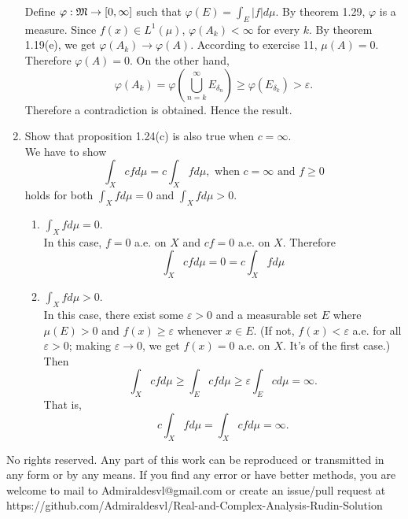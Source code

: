 \documentclass{article}
\begin{document}
\begin{enumerate}
 	Define $\varphi:\mathfrak{M}\to[0,\infty]$ such that $\varphi(E)=\int_{E}|f|d\mu$. By theorem 1.29, $\varphi$ is a measure. Since $f(x)\in{L^1(\mu)}$, $\varphi(A_k)<\infty$ for every $k$. By theorem 1.19(e), we get $\varphi(A_k)\to\varphi(A)$. According to exercise 11, $\mu(A)=0$. Therefore $\varphi(A)=0$. On the other hand,
 	\[
 		\varphi(A_k)=\varphi(\bigcup_{n=k}^{\infty}E_{\delta_n})\geq\varphi(E_{\delta_k})>\varepsilon.
 	\]
 	Therefore a contradiction is obtained. Hence the result.
 	\item \exercise Show that proposition 1.24(c) is also true when $c=\infty$.\\
 	\solution We have to show
 	\[
 		\int_Xcfd\mu=c\int_{X}fd\mu,\text{ when }c=\infty\text{ and }f\geq0
 	\]
 	holds for both $\int_{X}fd\mu=0$ and $\int_{X}fd\mu>0$.
 	\begin{enumerate}
 		\item $\int_{X}fd\mu=0$.\\
 		
 		In this case, $f=0$ a.e. on $X$ and $cf=0$ a.e. on $X$. Therefore
 		\[
 			\int_{X}cfd\mu=0=c\int_{X}fd\mu
 		\]
 		\item $\int_{X}fd\mu>0$.\\
 		
 		In this case, there exist some $\varepsilon>0$ and a measurable set $E$ where $\mu(E)>0$ and $f(x)\geq\varepsilon$ whenever $x\in{E}$. (If not, $f(x)<\varepsilon$ a.e. for all $\varepsilon>0$; making $\varepsilon\to0$, we get $f(x)=0$ a.e. on $X$. It's of the first case.) Then
 		\[
 			\int_{X}cfd\mu\geq\int_{E}cfd\mu\geq\varepsilon\int_{E}cd\mu=\infty.
 		\]
 		That is,
 		\[
 			c\int_{X}fd\mu=\int_{X}cfd\mu=\infty.
 		\]
 	\end{enumerate}
\end{enumerate}
\newpage
No rights reserved. Any part of this work can be reproduced or transmitted in any form or by any means. If you find any error or have better methods, you are welcome to mail to Admiraldesvl@gmail.com or create an issue/pull request at https://github.com/Admiraldesvl/Real-and-Complex-Analysis-Rudin-Solution
\end{document}
